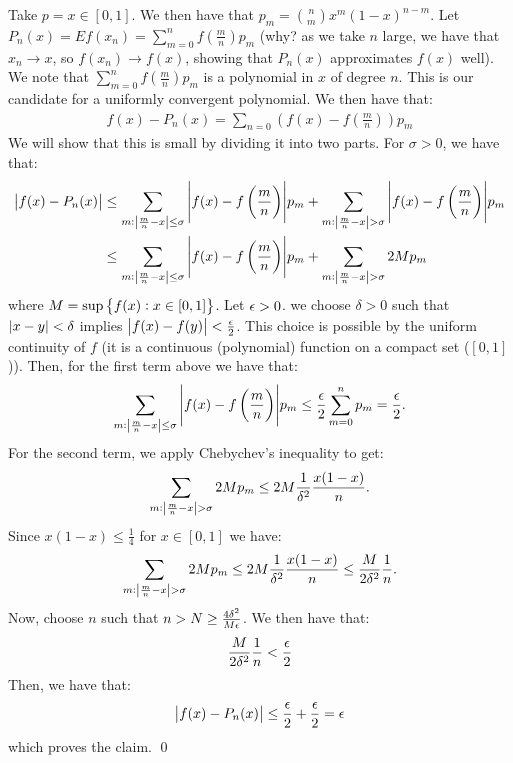 \begin{nproof}
    Take $p = x \in [0, 1]$. We then have that $p_m = \binom{n}{m}x^m(1-x)^{n-m}$. Let $P_n(x) = Ef(x_n) = \sum_{m=0}^n f(\frac{m}{n})p_m$ (why? as we take $n$ large, we have that $x_n \rightarrow x$, so $f(x_n) \rightarrow f(x)$, showing that $P_n(x)$ approximates $f(x)$ well). We note that $\sum_{m=0}^n f(\frac{m}{n})p_m$ is a polynomial in $x$ of degree $n$. This is our candidate for a uniformly convergent polynomial. We then have that:
    \begin{align*}
        f(x) - P_n(x) = \sum_{n=0}\left(f(x) - f\left(\frac{m}{n}\right)\right)p_m
    \end{align*}
    We will show that this is small by dividing it into two parts. For $\sigma > 0$, we have that:
    \begin{align*}
        \abs{f(x) - P_n(x)} &\leq \sum_{m: \abs{\frac{m}{n} - x} \leq \sigma} \abs{f(x) - f\left(\frac{m}{n}
        \right)}p_m + \sum_{m: \abs{\frac{m}{n} - x} > \sigma}\abs{f(x) - f\left(\frac{m}{n}\right)}p_m
        \\ &\leq \sum_{m: \abs{\frac{m}{n} - x} \leq \sigma} \abs{f(x) - f\left(\frac{m}{n}
        \right)}p_m + \sum_{m: \abs{\frac{m}{n} - x} > \sigma}2Mp_m
    \end{align*}
    where $M = \sup\set{f(x): x \in [0, 1]}$. Let $\epsilon > 0$. we choose $\delta > 0$ such that $\abs{x - y} < \delta$ implies $\abs{f(x) - f(y)} < \frac{\epsilon}{2}$. This choice is possible by the uniform continuity of $f$ (it is a continuous (polynomial) function on a compact set ($[0, 1]$)). Then, for the first term above we have that:
    \begin{align*}
        \sum_{m: \abs{\frac{m}{n} - x} \leq \sigma} \abs{f(x) - f\left(\frac{m}{n}
        \right)}p_m \leq \frac{\epsilon}{2}\sum_{m=0}^n p_m = \frac{\epsilon}{2}.
    \end{align*}
    For the second term, we apply Chebychev's inequality to get:
    \begin{align*}
        \sum_{m: \abs{\frac{m}{n} - x} > \sigma}2Mp_m \leq 2M\frac{1}{\delta^2}\frac{x(1-x)}{n}.
    \end{align*}
    Since $x(1-x) \leq \frac{1}{4}$ for $x \in [0, 1]$ we have:
    \begin{align*}
        \sum_{m: \abs{\frac{m}{n} - x} > \sigma}2Mp_m \leq 2M\frac{1}{\delta^2}\frac{x(1-x)}{n} \leq \frac{M}{2\delta^2}\frac{1}{n}.
    \end{align*}
    Now, choose $n$ such that $n > N \geq \frac{4\delta^2}{M\epsilon}$. We then have that:
    \begin{align*}
        \frac{M}{2\delta^2}\frac{1}{n} < \frac{\epsilon}{2}
    \end{align*}
    Then, we have that:
    \begin{align*}
        \abs{f(x) - P_n(x)} \leq \frac{\epsilon}{2} + \frac{\epsilon}{2} = \epsilon
    \end{align*}
    which proves the claim. \qed
\end{nproof}
